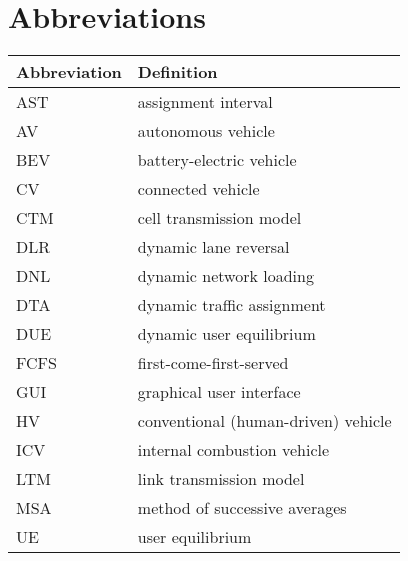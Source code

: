 \chapter{Abbreviations}

\begin{longtable}{ll}
\hline
Abbreviation & Definition\\\hline
\endhead
AST & assignment interval\\
AV & autonomous vehicle\\
BEV & battery-electric vehicle\\
CV & connected vehicle \\
CTM &  cell transmission model~\cite{daganzo1994cell, daganzo1995cell}\\
DLR & dynamic lane reversal~\cite{levin2016cell, duell2016system} \\
DNL & dynamic network loading~\cite{chiu2011dynamic} \\
DTA & dynamic traffic assignment~\cite{chiu2011dynamic} \\
DUE & dynamic user equilibrium~\cite{wardrop1952road, chiu2011dynamic} \\
FCFS & first-come-first-served~\cite{fajardo2011automated}\\
GUI & graphical user interface\\
HV & conventional (human-driven) vehicle\\
ICV & internal combustion vehicle\\
LTM & link transmission model~\cite{yperman2005link, yperman2007link}\\
MSA & method of successive averages\cite{levin2014improving}\\
UE & user equilibrium~\cite{wardrop1952road}\\
\hline
\end{longtable}